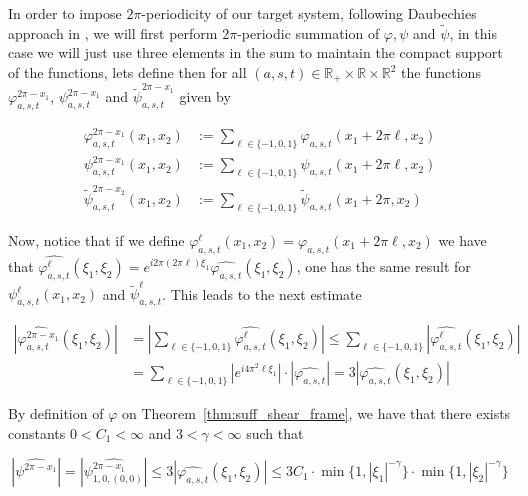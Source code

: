 \documentclass[a4paper]{article}
\begin{document}
\bigskip

In order to impose $2\pi$-periodicity of our target system, following Daubechies approach in \cite{Ten-lectures}, we will first perform $2\pi$-periodic summation of $\varphi, \psi$ and $\tilde{\psi}$, in this case we will just use three elements in the sum to maintain the compact support of the functions, lets define then for all $(a,s,t)\in\mathbb{R}_+\times\mathbb{R}\times\mathbb{R}^2$ the functions $\varphi^{2\pi-x_1}_{a,s,t}$, $\psi^{2\pi-x_1}_{a,s,t}$ and $\tilde{\psi}^{2\pi-x_1}_{a,s,t}$ given by

$$
\begin{aligned}
\varphi^{2\pi-x_1}_{a,s,t}(x_1,x_2) &:= \sum_{\ell\in\{-1,0,1\}}\varphi_{a,s,t}(x_1+2\pi\ell,x_2)\\
\psi^{2\pi-x_1}_{a,s,t}(x_1,x_2) &:= \sum_{\ell\in\{-1,0,1\}}\psi_{a,s,t}(x_1+2\pi\ell,x_2)\\
\tilde{\psi}^{2\pi-x_2}_{a,s,t}(x_1,x_2) &:= \sum_{\ell\in\{-1,0,1\}}\tilde{\psi}_{a,s,t}(x_1+2\pi,x_2)
\end{aligned}
$$

Now, notice that if we define $\varphi^{\ell}_{a,s,t}(x_1,x_2)=\varphi_{a,s,t}(x_1+2\pi\ell,x_2)$ we have that $\widehat{\varphi^{\ell}_{a,s,t}}(\xi_1,\xi_2)=e^{i2\pi(2\pi\ell)\xi_1}\widehat{\varphi_{a,s,t}}(\xi_1,\xi_2)$, one has the same result for $\psi^{\ell}_{a,s,t}(x_1,x_2)$ and $\tilde{\psi}^{\ell}_{a,s,t}$. This leads to the next estimate

$$
\begin{aligned}
|\widehat{\varphi^{2\pi-x_1}_{a,s,t}}(\xi_1,\xi_2)| &= |\sum_{\ell\in\{-1,0,1\}}\widehat{\varphi^{\ell}_{a,s,t}}(\xi_1,\xi_2)|\leq \sum_{\ell\in\{-1,0,1\}}|\widehat{\varphi^{\ell}_{a,s,t}}(\xi_1,\xi_2)| \\
& = \sum_{\ell\in\{-1,0,1\}}|e^{i4\pi^2\ell\xi_1}|\cdot|\widehat{\varphi_{a,s,t}}| = 3|\widehat{\varphi_{a,s,t}}(\xi_1,\xi_2)|
\end{aligned}
$$

\bigskip

By definition of $\varphi$ on Theorem~\ref{thm:suff_shear_frame}, we have that there exists constants $0<C_1<\infty$ and $3<\gamma<\infty$ such that 

\bigskip

$$
|\widehat{\psi^{2\pi-x_1}}|=|\widehat{\psi^{2\pi-x_1}_{1,0,(0,0)}}|\leq 3|\widehat{\varphi_{a,s,t}}(\xi_1,\xi_2)| \leq 3C_1\cdot \min\{1,|\xi_1|^{-\gamma}\}\cdot\min\{1,|\xi_2|^{-\gamma}\}
$$

\bigskip
\end{document}
